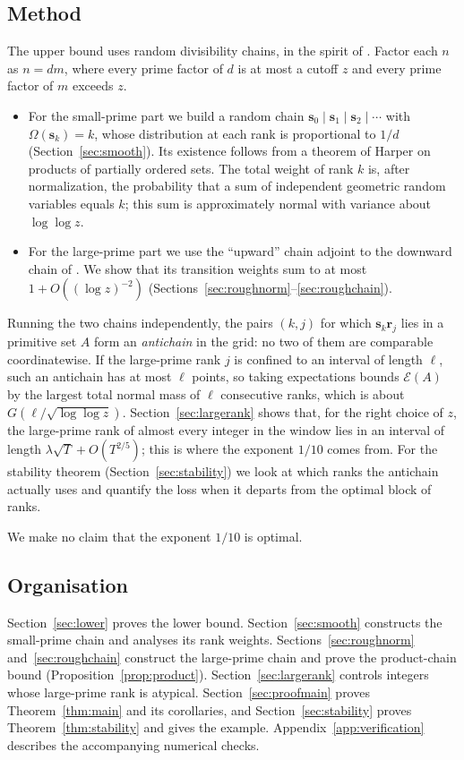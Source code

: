 \documentclass[11pt,a4paper]{article}
\numberwithin{equation}{section}
\theoremstyle{plain}
\theoremstyle{definition}
\theoremstyle{remark}
\newcommand{\cE}{\mathcal{E}}
\newcommand{\bs}{\mathbf{s}}
\newcommand{\br}{\mathbf{r}}
\begin{document}
\subsection{Method}
The upper bound uses random divisibility chains, in the spirit of \cite{ABLLPSTT}. Factor each $n$ as $n=dm$, where every prime factor of $d$ is at most a cutoff $z$ and every prime factor of $m$ exceeds $z$.
\begin{itemize}
\item For the small-prime part we build a random chain $\bs_0\mid\bs_1\mid\bs_2\mid\cdots$ with $\Omega(\bs_k)=k$, whose distribution at each rank is proportional to $1/d$ (Section~\ref{sec:smooth}). Its existence follows from a theorem of Harper on products of partially ordered sets. The total weight of rank $k$ is, after normalization, the probability that a sum of independent geometric random variables equals $k$; this sum is approximately normal with variance about $\log\log z$.
\item For the large-prime part we use the ``upward'' chain adjoint to the downward chain of \cite[Section~2.2]{ABLLPSTT}. We show that its transition weights sum to at most $1+O((\log z)^{-2})$ (Sections~\ref{sec:roughnorm}--\ref{sec:roughchain}).
\end{itemize}
Running the two chains independently, the pairs $(k,j)$ for which $\bs_k\br_j$ lies in a primitive set $A$ form an \emph{antichain} in the grid: no two of them are comparable coordinatewise. If the large-prime rank $j$ is confined to an interval of length $\ell$, such an antichain has at most $\ell$ points, so taking expectations bounds $\cE(A)$ by the largest total normal mass of $\ell$ consecutive ranks, which is about $G(\ell/\sqrt{\log\log z})$. Section~\ref{sec:largerank} shows that, for the right choice of $z$, the large-prime rank of almost every integer in the window lies in an interval of length $\lambda\sqrt T+O(T^{2/5})$; this is where the exponent $1/10$ comes from. For the stability theorem (Section~\ref{sec:stability}) we look at which ranks the antichain actually uses and quantify the loss when it departs from the optimal block of ranks.

We make no claim that the exponent $1/10$ is optimal.

\subsection{Organisation}
Section~\ref{sec:lower} proves the lower bound. Section~\ref{sec:smooth} constructs the small-prime chain and analyses its rank weights. Sections~\ref{sec:roughnorm} and~\ref{sec:roughchain} construct the large-prime chain and prove the product-chain bound (Proposition~\ref{prop:product}). Section~\ref{sec:largerank} controls integers whose large-prime rank is atypical. Section~\ref{sec:proofmain} proves Theorem~\ref{thm:main} and its corollaries, and Section~\ref{sec:stability} proves Theorem~\ref{thm:stability} and gives the example. Appendix~\ref{app:verification} describes the accompanying numerical checks.
\end{document}

